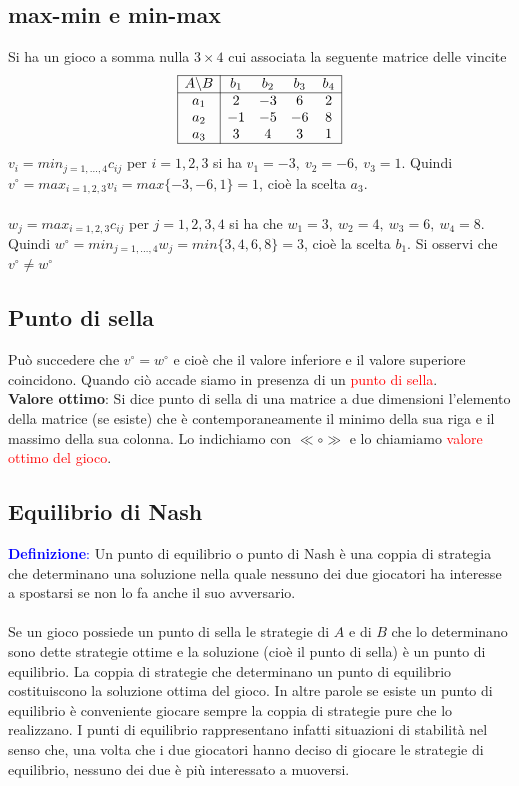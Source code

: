 \documentclass[12pt,a4paper]{article}
\begin{document}
\subsection{max-min e min-max}
Si ha un gioco a somma nulla $3 \times 4$ cui associata la seguente matrice delle vincite
$$\begin{array}{|c|cccc|}
\hline
A \backslash B& b_1 & b_2 & b_3 & b_4\\ \hline
a_1 & 2 & -3 & 6 & 2\\
a_2 & -1 & -5 & -6 & 8\\
a_3 & 3 & 4 & 3 & 1\\ \hline
\end{array}$$
$v_i = min_{j=1,\dots, 4}c_{ij}$ per $i=1,2,3$ si ha $v_1=-3, \ v_2 = -6, \ v_3 = 1$. Quindi $v^\circ = max_{i=1,2,3} v_i = max\{-3,-6,1\} = 1$, cioè la scelta $a_3$.\\
\\
$w_j=max_{i=1,2,3}c_{ij}$ per $j=1,2,3,4$ si ha che $w_1=3,\ w_2=4,\ w_3=6, \ w_4 = 8$. Quindi $w^\circ = min_{j=1,\dots, 4}w_j = min\{3,4,6,8\}=3$, cioè la scelta $b_1$.
Si osservi che $v^\circ \not = w^\circ$

\subsection{Punto di sella}
Può succedere che $v^\circ = w^\circ$ e cioè che il valore inferiore e il valore superiore coincidono. Quando ciò accade siamo in presenza di un \textcolor{red}{punto di sella}.\\
\textbf{Valore ottimo}: Si dice punto di sella di una matrice a due dimensioni l’elemento della matrice (se esiste) che è contemporaneamente il minimo della sua riga e il massimo della sua colonna. Lo indichiamo con $\ll \circ \gg$ e lo chiamiamo \textcolor{red}{valore ottimo del gioco}.

\subsection{Equilibrio di Nash}
\textcolor{blue}{\textbf{Definizione}:} Un punto di equilibrio o punto di Nash è una coppia di strategia che determinano una soluzione nella quale nessuno dei due giocatori ha interesse a spostarsi se non lo fa anche il suo avversario.\\
\\
Se un gioco possiede un punto di sella le strategie di $A$ e di $B$ che lo determinano sono dette strategie ottime e la soluzione (cioè il punto di sella) è un punto di equilibrio. La coppia di strategie che determinano un punto di equilibrio costituiscono la soluzione ottima del gioco.
In altre parole se esiste un punto di equilibrio è conveniente giocare sempre la coppia di strategie pure che lo realizzano. I punti di equilibrio rappresentano infatti situazioni di stabilità nel senso che, una volta che i due giocatori hanno deciso di giocare le strategie di equilibrio, nessuno dei due è più interessato a muoversi.
\end{document}
